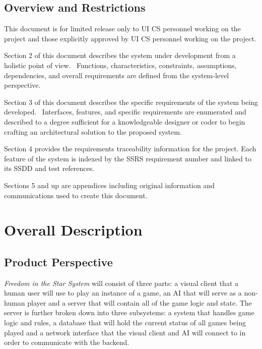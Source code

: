 \documentclass[twoside,letterpaper]{article}
\begin{document}
\subsection{Overview and Restrictions}
This document is for limited release only to UI CS personnel working on
the project and those explicitly approved by UI CS personnel working on the project.

Section 2 of this document describes the system under development from a
holistic point of view. \ Functions, characteristics, constraints,
assumptions, dependencies, and overall requirements are defined from
the system-level perspective.

Section 3 of this document describes the specific requirements of the
system being developed. \ Interfaces, features, and specific
requirements are enumerated and described to a degree sufficient for a
knowledgeable designer or coder to begin crafting an architectural
solution to the proposed system.

Section 4 provides the requirements traceability information for the
project.  Each feature of the system is indexed by the SSRS
requirement number and linked to its SSDD and test references.

Sections 5 and up are appendices including original information and
communications used to create this document.



\section{Overall Description}

\subsection{Product Perspective}
\textit{Freedom in the Star System} will consist of three parts: a visual client that a human user will use to play an instance of a game, an AI that will serve as a non-human player and a server that will contain all of the game logic and state.  The server is further broken down into three subsystems: a system that handles game logic and rules, a database that will hold the current status of all games being played and a network interface that the visual client and AI will connect to in order to communicate with the backend.
\end{document}
